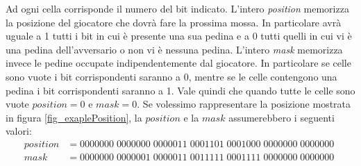 \documentclass[a4paper]{article}
\begin{document}
Ad ogni cella corrisponde il numero del bit indicato. L'intero \emph{position} 
memorizza la posizione del giocatore che dovrà fare la prossima mossa. In 
particolare avrà uguale a 1 tutti i bit in cui è presente una sua pedina e a 0
tutti quelli in cui vi è una pedina dell'avversario o non vi è nessuna pedina. 
L'intero \emph{mask} memorizza invece le pedine occupate indipendentemente dal
giocatore. In particolare se celle sono vuote i bit corrispondenti saranno a 0, 
mentre se le celle contengono una pedina i bit corrispondenti saranno a 1. 
Vale quindi che quando tutte le celle sono vuote $position = 0$ e $mask = 0$. Se 
volessimo rappresentare la posizione mostrata in figura \ref{fig_exaplePosition},
la $position$ e la $mask$ assumerebbero i seguenti valori:
\begin{align*}
  position &= 0000000\; 0000000\; 0000011\; 0001101\; 0001000\; 0000000\; 0000000\\
  mask &= 0000000\; 0000001\; 0000011\; 0011111\; 0001111\; 0000000\; 0000000\;
\end{align*}
\end{document}
